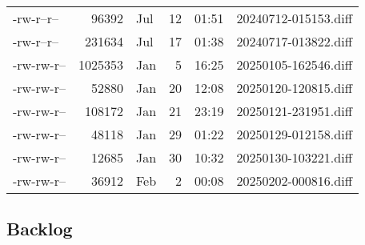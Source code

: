 \documentclass[a4paper]{article}
\begin{document}
\begin{longtable}{lrlrrl}
-rw-r--r-- & 96392 & Jul & 12 & 01:51 & 20240712-015153.diff\\[0pt]
-rw-r--r-- & 231634 & Jul & 17 & 01:38 & 20240717-013822.diff\\[0pt]
-rw-rw-r-- & 1025353 & Jan & 5 & 16:25 & 20250105-162546.diff\\[0pt]
-rw-rw-r-- & 52880 & Jan & 20 & 12:08 & 20250120-120815.diff\\[0pt]
-rw-rw-r-- & 108172 & Jan & 21 & 23:19 & 20250121-231951.diff\\[0pt]
-rw-rw-r-- & 48118 & Jan & 29 & 01:22 & 20250129-012158.diff\\[0pt]
-rw-rw-r-- & 12685 & Jan & 30 & 10:32 & 20250130-103221.diff\\[0pt]
-rw-rw-r-- & 36912 & Feb & 2 & 00:08 & 20250202-000816.diff\\[0pt]
\end{longtable}
\rmfamily

\subsection{Backlog}
\label{sec:orga35a984}
\end{document}
